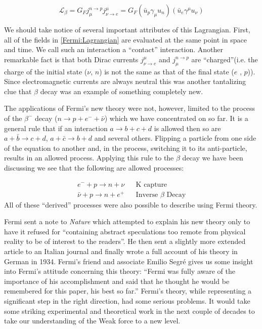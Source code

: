 \documentclass[a4paper,12pt]{book}
\begin{document}
\begin{equation}\label{Fermi:Lagrangian}
 \mathcal{L}_{\beta}=G_{F}j_{\mu}^{n\rightarrow p}j_{\nu \rightarrow e}^{\mu}=G_{F}\left(\bar{u}_{p}\gamma_{\mu} u_{n}\right)\left(\bar{u}_{e}\gamma^{\mu} u_{\nu}\right)
\end{equation}

We should take notice of several important attributes of this Lagrangian. First, all of the fields in \ref{Fermi:Lagrangian} are evaluated at the same point in space and time. We call such an interaction a ``contact'' interaction. Another remarkable fact is that both Dirac currents $j_{\nu \rightarrow e}^{\mu}$ and $j_{\mu}^{n\rightarrow p}$ are ``charged''(i.e. the charge of the initial state ($\nu$, $n$) is not the same as that of the final state ($e$ , $p$)). Since electromagnetic currents are always neutral this was another tantalizing clue that $\beta$ decay was an example of something completely new\cite{renton}.

The applications of Fermi's new theory were not, however, limited to the process of the $\beta^{-}$ decay ($n\rightarrow p+e^{-}+\bar{\nu}$) which we have concentrated on so far. It is a general rule that if an interaction $a\rightarrow b+c+d$ is allowed then so are $a+\bar{b}\rightarrow c+d$, $a+\bar{c}\rightarrow b+d$ and several others. Flipping a particle from one side of the equation to another and, in the process, switching it to its anti-particle, results in an allowed process. Applying this rule to the $\beta$ decay we have been discussing we see that the following are allowed processes:

\begin{align}
 e^{-}+p \rightarrow n+\nu && \text{K capture} \\
 \bar{\nu}+p \rightarrow n+e^{+} && \text{Inverse } \beta \text{ Decay}
\end{align}
All of these ``derived'' processes were also possible to describe using Fermi theory.

Fermi sent a note to \emph{Nature} which attempted to explain his new theory only to have it refused for  ``containing abstract speculations too remote from physical reality to be of interest to the readers''\cite{rasetti}. He then sent a slightly more extended article to an Italian journal\cite{fermi:italy} and finally wrote a full account of his theory in German\cite{fermi:german} in 1934\cite{brandt}. Fermi's friend and associate Emilio Segr\'{e} gives us some insight into Fermi's attitude concerning this theory\cite{segre}: ``Fermi was fully aware of the importance of his accomplishment and said that he thought he would be remembered for this paper, his best so far.''
Fermi's theory, while representing a significant step in the right direction, had some serious problems. It would take some striking experimental and theoretical work in the next couple of decades to take our understanding of the Weak force to a new level. 
\end{document}
